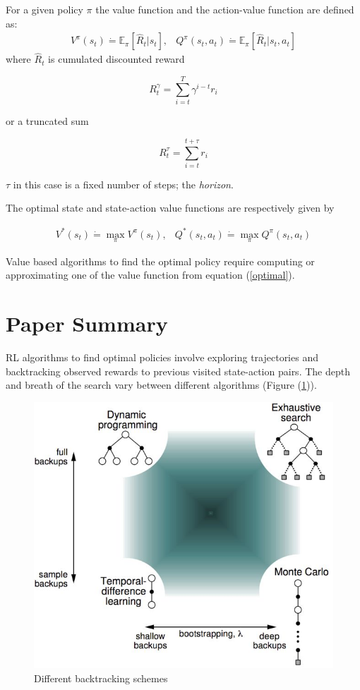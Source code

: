 \documentclass{article}
\def\defeq{\dot=}
\begin{document}
For a given policy $\pi$ the value function and the action-value function
are defined as:
    \begin{eqnarray*}
    V^\pi(s_t) \defeq \mathbb{E}_{\pi} [\hat{R}_t | s_t], &
    Q^\pi(s_t, a_t) \defeq \mathbb{E}_{\pi} [\hat{R}_t | s_t, a_t]
    \end{eqnarray*}
where $\hat{R}_t$ is cumulated discounted reward

\begin{equation}
R^\gamma_t = \sum_{i=t}^T \gamma^{i-t} r_i
\end{equation}

or a truncated sum

\begin{equation}
R^\tau_t = \sum_{i=t}^{t+\tau} r_i
\end{equation}

$\tau$ in this case is a fixed number of steps; the \emph{horizon}.

The optimal state and state-action value functions are respectively given by

\begin{eqnarray} \label{optimal}
    V^*(s_t) \defeq \max_{\pi}V^\pi(s_t), &
    Q^*(s_t, a_t) \defeq \max_{\pi} Q^\pi(s_t, a_t)
\end{eqnarray}

Value based algorithms to find the optimal policy require computing
or approximating one of the value function from equation (\ref{optimal}).

\section{Paper Summary}
RL algorithms to find optimal policies involve exploring trajectories
and backtracking observed rewards to previous visited state-action pairs.
The depth and breath of the search vary between different algorithms
(Figure (\ref{backups})).

\begin{figure}[H]
    \centering
    \includegraphics[scale=0.35]{backups}
    \caption{Different backtracking schemes \citet{suttonbarto2018}}
    \label{backups}
\end{figure}
\end{document}
